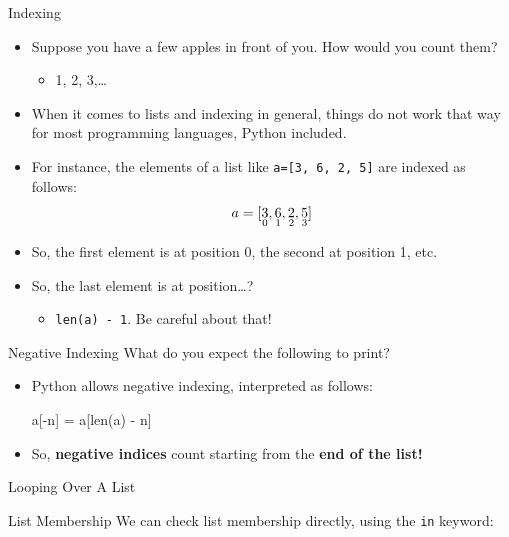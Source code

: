 \documentclass[aspectratio=169, 12pt, xcolor=table]{beamer}
\newcommand{\listindex}[2]{{\underset{#1}{\small #2}}}
\begin{document}
	\begin{headsup}{Indexing}
		\begin{itemize}
			\item Suppose you have a few apples in front of you. How would you count them?\pause
			\begin{itemize}
				\item 1, 2, 3,\ldots\pause
			\end{itemize}
			\item When it comes to lists and indexing in general, things do not work that way for most programming languages, Python included.\pause
			\item For instance, the elements of a list like \texttt{a=[3, 6, 2, 5]} are indexed as follows:
			\[a = [\listindex{0}{3},\listindex{1}{6},\listindex{2}{2}, \listindex{3}{5}]\]
			\item So, the first element is at position 0, the second at position 1, etc.\pause
			\item So, the last element is at position\ldots?\pause
			\begin{itemize}
				\item \texttt{len(a) - 1}. Be careful about that!
			\end{itemize}
		\end{itemize}
	\end{headsup}

	\begin{headsup}{Negative Indexing}
		What do you expect the following to print?
		\pause
		\begin{itemize}
			\item Python allows negative indexing, interpreted as follows:
			\begin{center}
				\ttfamily a[-n] = a[len(a) - n]
			\end{center}\pause
			\item So, \textbf{negative indices} count starting from the \textbf{end of the list!}
		\end{itemize}
	\end{headsup}

	\begin{frame}{Looping Over A List}
		
	\end{frame}
	
	\begin{frame}{List Membership}
		We can check list membership directly, using the \texttt{in} keyword:
		
	\end{frame}
\end{document}
